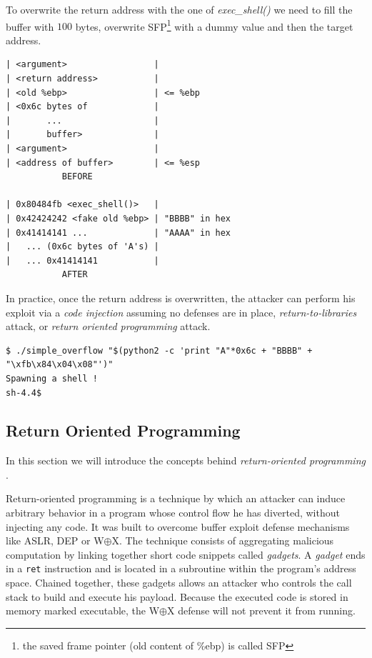 \documentclass[10pt,twocolumn]{article}
\begin{document}
To overwrite the return address with the one of \textit{exec\_shell()} we need
to fill the buffer with $100$ bytes, overwrite SFP\footnote{the saved frame
pointer (old content of \%ebp) is called SFP} with a dummy value and then the
target address.

\begin{lstlisting}[aboveskip=\bigskipamount,belowskip=\medskipamount,caption=Stack before and after overflow]
| <argument>                 |
| <return address>           |
| <old %ebp>                 | <= %ebp
| <0x6c bytes of             |
|       ...                  |
|       buffer>              |
| <argument>                 |
| <address of buffer>        | <= %esp
           BEFORE

| 0x80484fb <exec_shell()>   |
| 0x42424242 <fake old %ebp> | "BBBB" in hex
| 0x41414141 ...             | "AAAA" in hex
|   ... (0x6c bytes of 'A's) |
|   ... 0x41414141           |
           AFTER
\end{lstlisting}

In practice, once the return address is overwritten, the attacker can perform
his exploit via a \textit{code injection} assuming no defenses are in place,
\textit{return-to-libraries} attack, or \textit{return oriented programming}
attack.

\begin{lstlisting}[float=ht,belowskip=\medskipamount]
$ ./simple_overflow "$(python2 -c 'print "A"*0x6c + "BBBB" + "\xfb\x84\x04\x08"')"
Spawning a shell !
sh-4.4$
\end{lstlisting}

\subsection{Return Oriented Programming}
In this section we will introduce the concepts behind \textit{return-oriented programming
}\cite{roemer_return-oriented_2012}.

Return-oriented programming is a technique by which an attacker can induce
arbitrary behavior in a program whose control flow he has diverted, without
injecting any code. It was built to overcome buffer exploit defense
mechanisms like ASLR, DEP or W$\oplus$X. The technique consists of aggregating
malicious computation by linking together short code snippets called
\textit{gadgets}.  A \textit{gadget} ends in a \texttt{ret} instruction and is
located in a subroutine within the program's address space. Chained together,
these gadgets allows an attacker who controls the call stack to build and
execute his payload. Because the executed code is stored in memory marked
executable, the W$\oplus$X defense will not prevent it from running.
\end{document}
